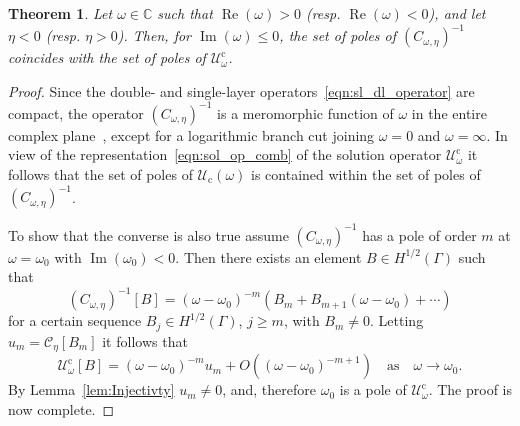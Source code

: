 \documentclass[11pt]{article}
\theoremstyle{plain}
\newtheorem{theorem}{Theorem}
\theoremstyle{remark}
\def \inv{^{-1}}
\renewcommand{\Re}{\operatorname{Re}}
\renewcommand{\Im}{\operatorname{Im}}
\begin{document}
\begin{theorem}\label{thm:app}
  Let $\omega \in \mathbb{C}$ such that $\Re(\omega) > 0$
  (resp. $\Re(\omega) < 0$), and let $\eta < 0$ (resp. $\eta >
  0$). Then, for $\Im(\omega) \leq 0$, the set of poles of
  $(C_{\omega,\eta})^{-1}$ coincides with the set of poles of
  $\mathcal{U}_{\omega}^\mathrm{c}$.
\end{theorem}
\begin{proof}
  Since the double- and single-layer
  operators~\eqref{eqn:sl_dl_operator} are compact, the operator
  $(C_{\omega,\eta})^{-1}$ is a meromorphic function of $\omega$ in
  the entire complex plane~\cite[Proposition 7.4]{taylorbook}, except
  for a logarithmic branch cut joining $\omega = 0$ and
  $\omega =\infty$. In view of the
  representation~\eqref{eqn:sol_op_comb} of the solution operator
  $\mathcal{U}^\mathrm{c}_\omega$ it follows that the set of poles of
  $\mathcal{U}_\mathrm{c}(\omega)$ is contained within the set of
  poles of $(C_{\omega,\eta})^{-1}$.

  To show that the converse is also true assume
  $(C_{\omega,\eta})\inv$ has a pole of order $m$ at
  $\omega = \omega_0$ with $\Im(\omega_0) < 0$.  Then there exists an
  element $B \in H^{1/2}(\Gamma)$ such that
    \begin{equation*}
      (C_{\omega,\eta})\inv [B] = (\omega - \omega_0)^{-m}\left(B_m + B_{m+1}(\omega - \omega_0) + \cdots\right)
      \end{equation*}
      for a certain sequence $B_j\in H^{1/2}(\Gamma)$, $j\geq m$, with
      $B_m\ne 0.$ Letting $u_m = \mathcal{C}_\eta[B_m]$ it follows
      that
     \begin{equation*}
        \mathcal{U}^\mathrm{c}_\omega [B] = (\omega - \omega_0)^{-m}u_m + O((\omega - \omega_0)^{-m +1}) \quad \mbox{as}\quad \omega \to \omega_0.
     \end{equation*}
     By Lemma~\ref{lem:Injectivty} $u_m \ne 0$, and, therefore
     $\omega_0$ is a pole of $\mathcal{U}^\mathrm{c}_\omega$. The
     proof is now complete.
\end{proof}



\end{document}
